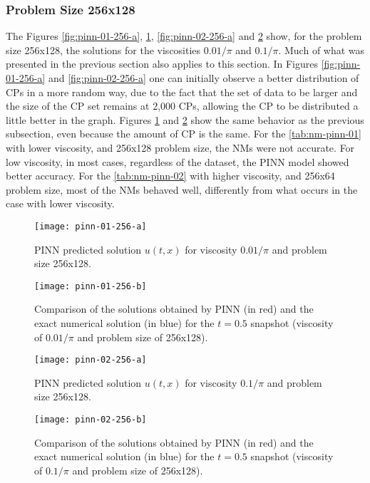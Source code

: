 \FloatBarrier

\subsubsection{Problem Size 256x128}

The Figures \ref{fig:pinn-01-256-a}, \ref{fig:pinn-01-256-b}, \ref{fig:pinn-02-256-a} and \ref{fig:pinn-02-256-b} show, for the problem size 256x128, the solutions for the viscosities ${0.01}/{\pi}$ and ${0.1}/{\pi}$. Much of what was presented in the previous section also applies to this section. In Figures \ref{fig:pinn-01-256-a} and \ref{fig:pinn-02-256-a} one can initially observe a better distribution of CPs in a more random way, due to the fact that the set of data to be larger and the size of the CP set remains at 2,000 CPs, allowing the CP to be distributed a little better in the graph. Figures \ref{fig:pinn-01-256-b} and \ref{fig:pinn-02-256-b} show the same behavior as the previous subsection, even because the amount of CP is the same. For the \autoref{tab:nm-pinn-01} with lower viscosity, and 256x128 problem size, the NMs were not accurate. For low viscosity, in most cases, regardless of the dataset, the PINN model showed better accuracy. For the \autoref{tab:nm-pinn-02} with higher viscosity, and 256x64 problem size, most of the NMs behaved well, differently from what occurs in the case with lower viscosity.

\begin{figure}[htb]\begin{minipage}[b]{\textwidth}\centering
\texttt{[image: pinn-01-256-a]}
\vspace{-1em}
\caption{PINN predicted solution $u(t, x)$ for viscosity ${0.01}/{\pi}$ and problem size 256x128.}
\label{fig:pinn-01-256-a}
\texttt{[image: pinn-01-256-b]}
\vspace{-1em}
\caption{Comparison of the solutions obtained by PINN (in red) and the exact numerical solution (in blue) for the $t=0.5$ snapshot (viscosity of ${0.01}/{\pi}$ and problem size of 256x128).}
\label{fig:pinn-01-256-b}
\end{minipage}\end{figure}

\begin{figure}[htb]\begin{minipage}[b]{\textwidth}\centering
\texttt{[image: pinn-02-256-a]}
\vspace{-1em}
\caption{PINN predicted solution $u(t, x)$ for viscosity ${0.1}/{\pi}$ and problem size 256x128.}
\label{fig:pinn-02-256-a}
\texttt{[image: pinn-02-256-b]}
\vspace{-1em}
\caption{Comparison of the solutions obtained by PINN (in red) and the exact numerical solution (in blue) for the $t=0.5$ snapshot (viscosity of ${0.1}/{\pi}$ and problem size of 256x128).}
\label{fig:pinn-02-256-b}
\end{minipage}\end{figure}

